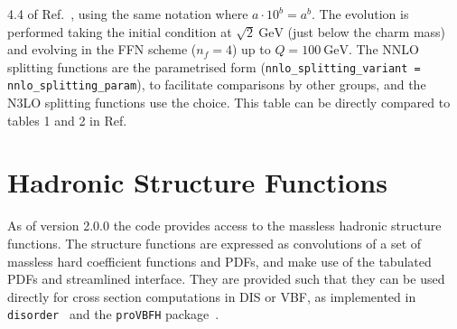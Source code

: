 \begin{table}
{    4.4 of Ref.~\cite{Dittmar:2005ed}, using the same notation where
    $a\cdot10^{b} = a^b$. The evolution is performed taking the
    initial condition at $\sqrt{2}~\text{GeV}$ (just below the charm
    mass) and evolving in the FFN scheme ($n_f = 4$) up to
    $Q=100~\text{GeV}$.
    The NNLO splitting functions are the parametrised form
    (\texttt{nnlo\_splitting\_variant = nnlo\_splitting\_param}), to 
    facilitate comparisons by other groups, and the N3LO splitting
    functions use the
     choice. This table can be directly compared to tables 1 and 2 in Ref.~\cite{Cooper-Sarkar:2024crx}}
  \label{tab:n3lo-evolve-nf4}
\end{table}



\section{Hadronic Structure Functions}
\label{sec:structure-funcs}
As of \hoppet version 2.0.0 the code provides access to the massless
hadronic structure functions. The structure functions are expressed as
convolutions of a set of massless hard coefficient functions and PDFs,
and make use of the tabulated PDFs and streamlined interface.  They
are provided such that they can be used directly for cross section
computations in DIS or VBF, as implemented in {\tt
  disorder}~\cite{Karlberg:2024hnl} and the {\tt proVBFH}
package~\cite{Cacciari:2015jma,Dreyer:2016oyx,Dreyer:2018qbw,Dreyer:2018rfu}.

